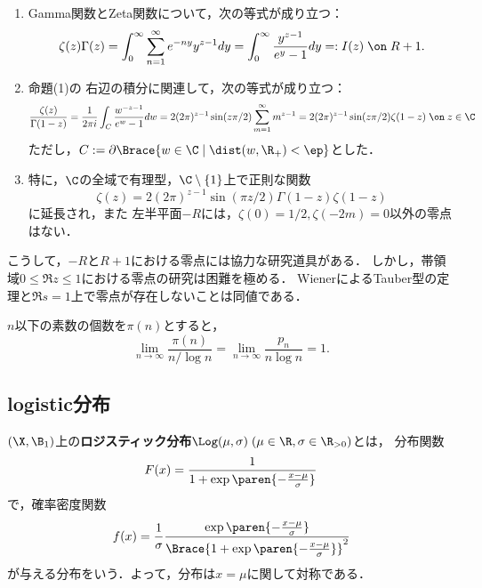 \documentclass[uplatex,dvipdfmx]{jsreport}
\begin{document}
\begin{proposition}[解析接続による有理型関数への延長]\mbox{}
    \begin{enumerate}
        \item Gamma関数とZeta関数について，次の等式が成り立つ：
        \[\zeta(z)\Gamma(z)=\int^\infty_0\sum^\infty_{n=1}e^{-ny}y^{z-1}dy=\int^\infty_0\frac{y^{z-1}}{e^y-1}dy=:I(z)\;\on\;R+1.\]
        \item 
        命題(1)の
        右辺の積分に関連して，次の等式が成り立つ：
        \[\frac{\zeta(z)}{\Gamma(1-z)}=\frac{1}{2\pi i}\int_C\frac{w^{-z-1}}{e^{w}-1}dw=2(2\pi)^{z-1}\sin(z\pi/2)\sum_{m=1}^\infty m^{z-1}=2(2\pi)^{z-1}\sin(z\pi/2)\zeta(1-z)\;\on\; z\in\C\]
        ただし，$C:=\partial\Brace{w\in\C\mid\dist(w,\R_+)<\ep}$とした．
        \item 特に，$\C$の全域で有理型，$\C\setminus\{1\}$上で正則な関数
        \[\zeta(z)=2(2\pi)^{z-1}\sin(\pi z/2)\Gamma(1-z)\zeta(1-z)\]
        に延長され，また
        左半平面$-R$には，$\zeta(0)=1/2,\zeta(-2m)=0$以外の零点はない．
    \end{enumerate}
\end{proposition}
\begin{remarks}
    こうして，$-R$と$R+1$における零点には協力な研究道具がある．
    しかし，帯領域$0\le \Re z\le 1$における零点の研究は困難を極める．
    WienerによるTauber型の定理と$\Re s=1$上で零点が存在しないことは同値である．
\end{remarks}

\begin{corollary}
    $n$以下の素数の個数を$\pi(n)$とすると，
    \[\lim_{n\to\infty}\frac{\pi(n)}{n/\log n}=\lim_{n\to\infty}\frac{p_n}{n\log n}=1.\]
\end{corollary}

\subsection{logistic分布}

\begin{definition}
    $(\X,\B_1)$上の\textbf{ロジスティック分布}$\Log(\mu,\sigma)\;(\mu\in\R,\sigma\in\R_{>0})$とは，
    分布関数
    \[F(x)=\frac{1}{1+\exp\paren{-\frac{x-\mu}{\sigma}}}\]
    で，確率密度関数
    \[f(x)=\frac{1}{\sigma}\frac{\exp\paren{-\frac{x-\mu}{\sigma}}}{\Brace{1+\exp\paren{-\frac{x-\mu}{\sigma}}}^2}\]
    が与える分布をいう．よって，分布は$x=\mu$に関して対称である．
\end{definition}
\end{document}
